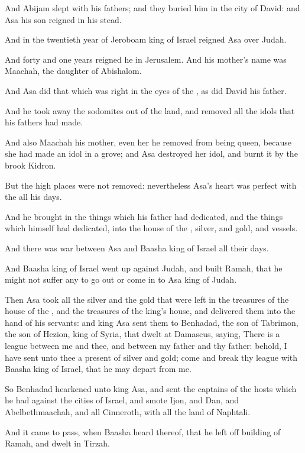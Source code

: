 \Verse And Abijam slept with his fathers; and they buried him in the city of David: and Asa his son reigned in his stead.

\Verse And in the twentieth year of Jeroboam king of Israel reigned Asa over Judah.

\Verse And forty and one years reigned he in Jerusalem. And his mother's name was Maachah, the daughter of Abishalom.

\Verse And Asa did that which was right in the eyes of the \LORD, as did David his father.

\Verse And he took away the sodomites out of the land, and removed all the idols that his fathers had made.

\Verse And also Maachah his mother, even her he removed from being queen, because she had made an idol in a grove; and Asa destroyed her idol, and burnt it by the brook Kidron.

\Verse But the high places were not removed: nevertheless Asa's heart was perfect with the \LORD all his days.

\Verse And he brought in the things which his father had dedicated, and the things which himself had dedicated, into the house of the \LORD, silver, and gold, and vessels.

\Verse And there was war between Asa and Baasha king of Israel all their days.

\Verse And Baasha king of Israel went up against Judah, and built Ramah, that he might not suffer any to go out or come in to Asa king of Judah.

\Verse Then Asa took all the silver and the gold that were left in the treasures of the house of the \LORD, and the treasures of the king's house, and delivered them into the hand of his servants: and king Asa sent them to Benhadad, the son of Tabrimon, the son of Hezion, king of Syria, that dwelt at Damascus, saying, \Verse There is a league between me and thee, and between my father and thy father: behold, I have sent unto thee a present of silver and gold; come and break thy league with Baasha king of Israel, that he may depart from me.

\Verse So Benhadad hearkened unto king Asa, and sent the captains of the hosts which he had against the cities of Israel, and smote Ijon, and Dan, and Abelbethmaachah, and all Cinneroth, with all the land of Naphtali.

\Verse And it came to pass, when Baasha heard thereof, that he left off building of Ramah, and dwelt in Tirzah.

